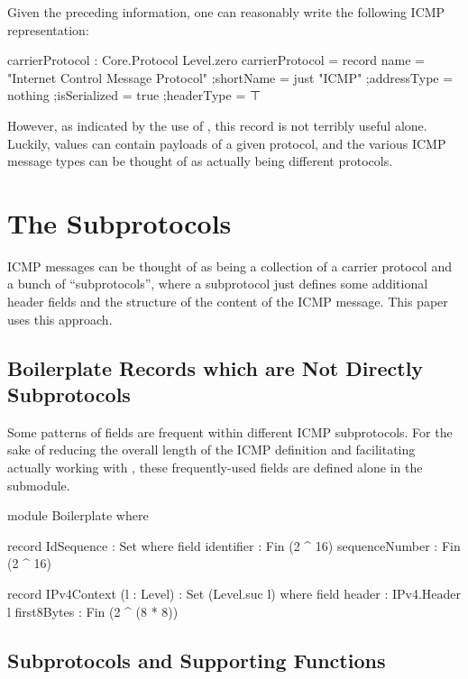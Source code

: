 \documentclass{report}
\begin{document}
Given the preceding information, one can reasonably write the following ICMP representation:

\begin{code}
  carrierProtocol : Core.Protocol Level.zero
  carrierProtocol = record
    {name = "Internet Control Message Protocol"
    ;shortName = just "ICMP"
    ;addressType = nothing
    ;isSerialized = true
    ;headerType = ⊤
    }
\end{code}

However, as indicated by the use of , this record is not terribly useful alone.  Luckily,  values can contain payloads of a given protocol, and the various ICMP message types can be thought of as actually being different protocols.

\section{The Subprotocols}
ICMP messages can be thought of as being a collection of a carrier protocol and a bunch of ``subprotocols'', where a subprotocol just defines some additional header fields and the structure of the content of the ICMP message.  This paper uses this approach.

\subsection{Boilerplate Records which are Not Directly Subprotocols}
Some patterns of fields are frequent within different ICMP subprotocols.  For the sake of reducing the overall length of the ICMP definition and facilitating actually working with , these frequently-used fields are defined alone in the  submodule.

\begin{code}
  module Boilerplate where

    record IdSequence : Set where
      field
        identifier : Fin (2 ^ 16)
        sequenceNumber : Fin (2 ^ 16)

    record IPv4Context (l : Level) : Set (Level.suc l) where
      field
        header : IPv4.Header l
        first8Bytes : Fin (2 ^ (8 * 8))
\end{code}

\subsection{Subprotocols and Supporting Functions}
\end{document}
